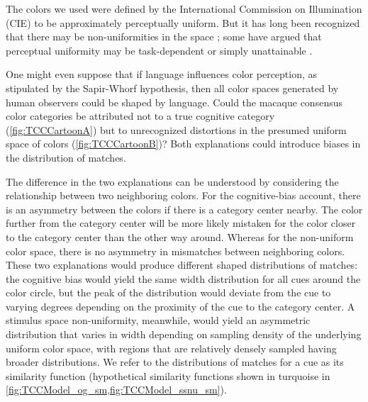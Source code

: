 The colors we used were defined by the International Commission on Illumination (CIE) to be approximately perceptually uniform. 
But it has long been recognized that there may be non-uniformities in the space \citep{stockman_colorimetry_2010}; some have argued that perceptual uniformity may be task-dependent or simply unattainable \citep{judd_ideal_1969}.

One might even suppose that if language influences color perception, as stipulated by the Sapir-Whorf hypothesis, then all color spaces generated by human observers could be shaped by language. 
Could the macaque consensus color categories be attributed not to a true cognitive category (\autoref{fig:TCCCartoonA}) but to unrecognized distortions in the presumed uniform space of colors (\autoref{fig:TCCCartoonB})?
Both explanations could introduce biases in the distribution of matches.

The difference in the two explanations can be understood by considering the relationship between two neighboring colors. 
For the cognitive-bias account, there is an asymmetry between the colors if there is a category center nearby.
The color further from the category center will be more likely mistaken for the color closer to the category center than the other way around. 
Whereas for the non-uniform color space, there is no asymmetry in mismatches between neighboring colors. 
These two explanations would produce different shaped distributions of matches: the cognitive bias would yield the same width distribution for all cues around the color circle, but the peak of the distribution would deviate from the cue to varying degrees depending on the proximity of the cue to the category center. 
A stimulus space non-uniformity, meanwhile, would yield an asymmetric distribution that varies in width depending on sampling density of the underlying uniform color space, with regions that are relatively densely sampled having broader distributions. 
We refer to the distributions of matches for a cue as its similarity function (hypothetical similarity functions shown in turquoise in \autoref{fig:TCCModel_og_sm,fig:TCCModel_ssnu_sm}).


